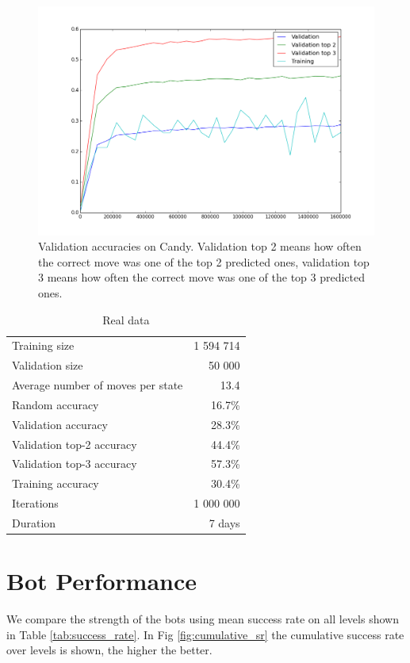 \documentclass{kththesis}
\begin{document}
\begin{figure}[!htb]
\centering
\includegraphics[width=\textwidth]{images/real_validation.png}
\caption{Validation accuracies on Candy. Validation top 2 means how often the correct move was one of the top 2 predicted ones, validation top 3 means how often the correct move was one of the top 3 predicted ones.}\label{fig:candy_real_validation_accuracy}
\end{figure}

\begin{table}
\caption{Real data}
\centering
\begin{tabular}{ l | r }
\hline
Training size & 1 594 714\\
Validation size & 50 000\\
Average number of moves per state & 13.4 \\
Random accuracy & 16.7\% \\
Validation accuracy & 28.3\% \\
Validation top-2 accuracy & 44.4\% \\
Validation top-3 accuracy & 57.3\% \\
Training accuracy & 30.4\% \\
Iterations & 1 000 000 \\
Duration & 7 days \\
\hline
\end{tabular}
\end{table}

\section{Bot Performance}
We compare the strength of the bots using mean success rate on all levels shown in Table \ref{tab:success_rate}. In Fig \ref{fig:cumulative_sr} the cumulative success rate over levels is shown, the higher the better.
\end{document}
